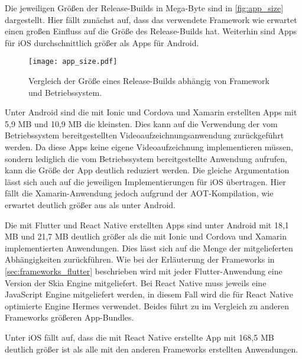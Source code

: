 Die jeweiligen Größen der Release-Builds in Mega-Byte sind in \autoref{fig:app_size} dargestellt.
Hier fällt zunächst auf, dass das verwendete Framework wie erwartet einen großen Einfluss auf die Größe des Release-Builds hat.
Weiterhin sind Apps für iOS durchschnittlich größer als Apps für Android.
\begin{figure}[ht]
  \centering 
  \texttt{[image: app\_size.pdf]}
  \caption{Vergleich der Größe eines Release-Builds abhängig von Framework und Betriebssystem.}
  \label{fig:app_size}
\end{figure}
Unter Android sind die mit Ionic und Cordova und Xamarin erstellten Apps mit 5,9 MB und 10,9 MB die kleinsten.
Dies kann auf die Verwendung der vom Betriebssystem bereitgestellten Videoaufzeichnungsanwendung zurückgeführt werden.
Da diese Apps keine eigene Videoaufzeichnung implementieren müssen, sondern lediglich die vom Betriebssystem bereitgestellte Anwendung aufrufen, kann die Größe der App deutlich reduziert werden.
Die gleiche Argumentation lässt sich auch auf die jeweiligen Implementierungen für iOS übertragen.
Hier fällt die Xamarin-Anwendung jedoch aufgrund der \ac{AOT}-Kompilation, wie erwartet deutlich größer aus als unter Android.

Die mit Flutter und React Native erstellten Apps sind unter Android mit 18,1 MB und 21,7 MB deutlich größer als die mit Ionic und Cordova und Xamarin implementierten Anwendungen.
Dies lässt sich auf die Menge der mitgelieferten Abhängigkeiten zurückführen.
Wie bei der Erläuterung der Frameworks in \autoref{sec:frameworks_flutter} beschrieben wird mit jeder Flutter-Anwendung eine Version der Skia Engine mitgeliefert.
Bei React Native muss jeweils eine JavaScript Engine mitgeliefert werden, in diesem Fall wird die für React Native optimierte Engine Hermes verwendet.
Beides führt zu im Vergleich zu anderen Frameworks größeren App-Bundles.

Unter iOS fällt auf, dass die mit React Native erstellte App mit 168,5 MB deutlich größer ist als alle mit den anderen Frameworks erstellten Anwendungen.


